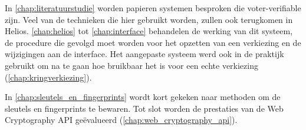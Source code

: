 \npar In \ref{chap:literatuurstudie} worden papieren systemen besproken die voter-verifiable zijn. Veel van de technieken die hier gebruikt worden, zullen ook terugkomen in Helios. \ref{chap:helios} tot \ref{chap:interface} behandelen de werking van dit systeem, de procedure die gevolgd moet worden voor het opzetten van een verkiezing en de wijzigingen aan de interface. Het aangepaste systeem werd ook in de praktijk gebruikt om na te gaan hoe bruikbaar het is voor een echte verkiezing (\ref{chap:kringverkiezing}). 

\npar In \ref{chap:sleutels_en_fingerprints} wordt kort gekeken naar methoden om de sleutels en fingerprints te bewaren. Tot slot worden de prestaties van de Web Cryptography API ge\"evalueerd (\ref{chap:web_cryptography_api}).
